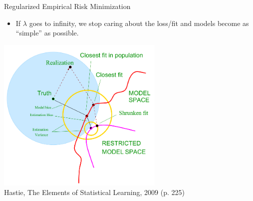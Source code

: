 \begin{vbframe}{Regularized Empirical Risk Minimization}
\begin{itemize}
  \item If $\lambda$ goes to infinity, we stop caring about the loss/fit and models become as \enquote{simple} as possible.
\end{itemize}

\framebreak


\center
\vspace*{0.5cm}
\includegraphics[width=0.6\textwidth]{figure_man/biasvariance_scheme.png} \\
\footnotesize{Hastie, The Elements of Statistical Learning, 2009 (p. 225)}


\end{vbframe}



\endlecture

